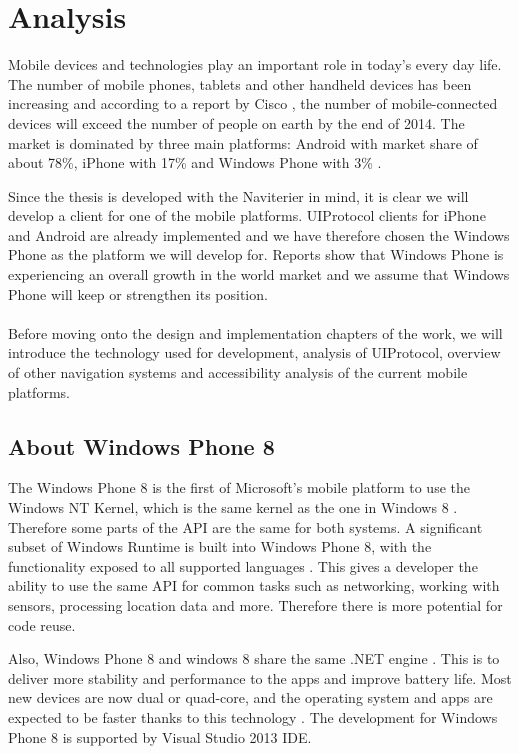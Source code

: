 \chapter{Analysis}
Mobile devices and technologies play an important role in today's every day life. The number of mobile phones, tablets and other handheld devices has been increasing and according to a report by Cisco \cite{cisco}, the number of mobile-connected devices will exceed the number of people on earth by the end of 2014. The market is dominated by three main platforms: Android with market share of about 78\%, iPhone with 17\% and Windows Phone with 3\% \cite{phoneMkt}.

Since the thesis is developed with the Naviterier in mind, it is clear we will develop a client for one of the mobile platforms. UIProtocol clients for iPhone and Android are already implemented and we have therefore chosen the Windows Phone as the platform we will develop for. Reports show that Windows Phone is experiencing an overall growth in the world market\cite{phoneMkt} and we assume that Windows Phone will keep or strengthen its position.\\\\
Before moving onto the design and implementation chapters of the work, we will introduce the technology used for development, analysis of UIProtocol, overview of other navigation systems and accessibility analysis of the current mobile platforms.

\section{About Windows Phone 8}
The Windows Phone 8 is the first of Microsoft's mobile platform to use the Windows NT Kernel, which is the same kernel as the one in Windows 8 \cite{wp8kernel}. Therefore some parts of the API are the same for both systems. A significant subset of Windows Runtime is built into Windows Phone 8, with the functionality exposed to all supported languages \cite{wp8comparison}. This gives a developer the ability to use the same API for common tasks such as networking, working with sensors, processing location data and more. Therefore there is more potential for code reuse.

Also, Windows Phone 8 and windows 8 share the same .NET engine \cite{wp8comparison}. This is to deliver more stability and performance to the apps and improve battery life. Most new devices are now dual or quad-core, and the operating system and apps are expected to be faster thanks to this technology \cite{wp8comparison}. The development for Windows Phone 8 is supported by Visual Studio 2013 IDE.

